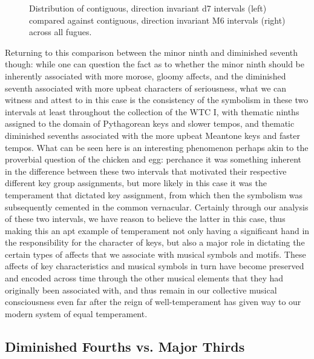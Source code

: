 \begin{figure}[H]
\vspace{1.5em}
    \centering
    \caption[Distribution of contiguous direction invariant d7 intervals compared against contiguous direction invariant M6 intervals across all fugues. ]{Distribution of contiguous, direction invariant d7 intervals (left) compared against contiguous, direction invariant M6 intervals (right) across all fugues.}
\end{figure}    Returning to this comparison between the minor ninth and diminished
seventh though: while one can question the fact as to whether the minor
ninth should be inherently associated with more morose, gloomy affects,
and the diminished seventh associated with more upbeat characters of
seriousness, what we can witness and attest to in this case is the
consistency of the symbolism in these two intervals at least throughout
the collection of the WTC I, with thematic ninths assigned to the domain
of Pythagorean keys and slower tempos, and thematic diminished sevenths
associated with the more upbeat Meantone keys and faster tempos. What
can be seen here is an interesting phenomenon perhaps akin to the
proverbial question of the chicken and egg: perchance it was something
inherent in the difference between these two intervals that motivated
their respective different key group assignments, but more likely in
this case it was the temperament that dictated key assignment, from
which then the symbolism was subsequently cemented in the common
vernacular. Certainly through our analysis of these two intervals, we
have reason to believe the latter in this case, thus making this an apt
example of temperament not only having a significant hand in the
responsibility for the character of keys, but also a major role in
dictating the certain types of affects that we associate with musical
symbols and motifs. These affects of key characteristics and musical
symbols in turn have become preserved and encoded across time through
the other musical elements that they had originally been associated
with, and thus remain in our collective musical consciousness even far
after the reign of well-temperament has given way to our modern system
of equal temperament.

    \subsection{Diminished Fourths vs. Major
Thirds}\label{diminished-fourths-vs.-major-thirds}

